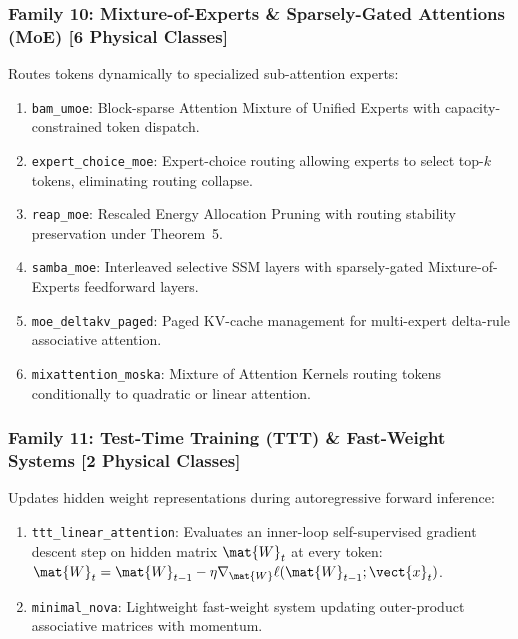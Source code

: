 \subsubsection{Family 10: Mixture-of-Experts \& Sparsely-Gated Attentions (MoE) [6 Physical Classes]}
Routes tokens dynamically to specialized sub-attention experts:
\begin{enumerate}
    \item \texttt{bam\_umoe}: Block-sparse Attention Mixture of Unified Experts with capacity-constrained token dispatch.
    \item \texttt{expert\_choice\_moe}: Expert-choice routing allowing experts to select top-$k$ tokens, eliminating routing collapse.
    \item \texttt{reap\_moe}: Rescaled Energy Allocation Pruning with routing stability preservation under Theorem~5.
    \item \texttt{samba\_moe}: Interleaved selective SSM layers with sparsely-gated Mixture-of-Experts feedforward layers.
    \item \texttt{moe\_deltakv\_paged}: Paged KV-cache management for multi-expert delta-rule associative attention.
    \item \texttt{mixattention\_moska}: Mixture of Attention Kernels routing tokens conditionally to quadratic or linear attention.
\end{enumerate}

\subsubsection{Family 11: Test-Time Training (TTT) \& Fast-Weight Systems [2 Physical Classes]}
Updates hidden weight representations during autoregressive forward inference:
\begin{enumerate}
    \item \texttt{ttt\_linear\_attention}: Evaluates an inner-loop self-supervised gradient descent step on hidden matrix $\mat{W}_t$ at every token: $\mat{W}_t = \mat{W}_{t-1} - \eta \nabla_{\mat{W}} \ell(\mat{W}_{t-1}; \vect{x}_t)$.
    \item \texttt{minimal\_nova}: Lightweight fast-weight system updating outer-product associative matrices with momentum.
\end{enumerate}

